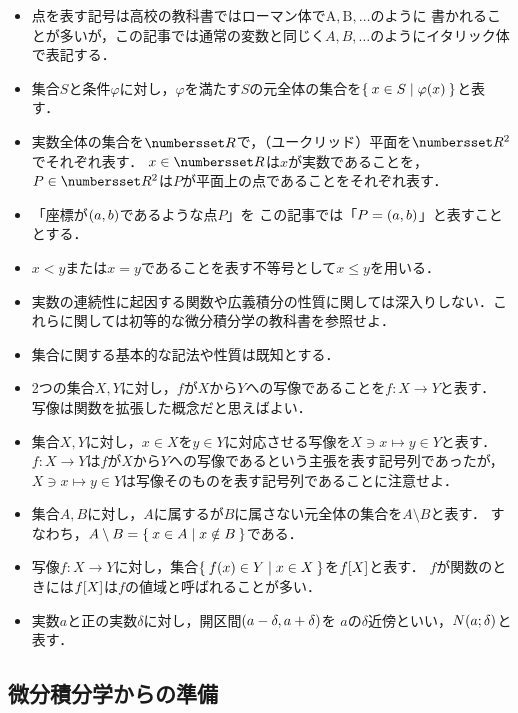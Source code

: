 \documentclass[11pt,a4paper]{ltjsarticle}
\newcommand*{\coord}[1]{\paren{#1}}
\newcommand*{\image}[2]{#1 \sqbracket*{#2}}
\newcommand*{\neighbourfood}[2]{\apply{N}{{#1};{#2}}}
\theoremstyle{definition}
\begin{document}
\begin{itemize}
  \item 点を表す記号は高校の教科書ではローマン体で$\mathrm{A}, \mathrm{B}, \dotsc$のように
        書かれることが多いが，この記事では通常の変数と同じく$A,B, \dotsc$のようにイタリック体で表記する．
  \item 集合$S$と条件$\varphi$に対し，$\varphi$を満たす$S$の元全体の集合を$\setintension{x \in S}{\apply{\varphi}{x}}$と表す．
  \item 実数全体の集合を$\Real$で，（ユークリッド）平面を$\Real ^2$でそれぞれ表す．
        $x \in \Real$は$x$が実数であることを，$P \in \Real ^2$は$P$が平面上の点であることをそれぞれ表す．
  \item 「座標が$\coord{a,b}$であるような点$P$」を
        この記事では「$P = \coord{a,b}$」と表すこととする．
  \item $x < y$または$x = y$であることを表す不等号として$x \leq y$を用いる．
  \item 実数の連続性に起因する関数や広義積分の性質に関しては深入りしない．これらに関しては初等的な微分積分学の教科書を参照せよ．
  \item 集合に関する基本的な記法や性質は既知とする．
  \item 2つの集合$X,Y$に対し，$f$が$X$から$Y$への写像であることを$f \colon X \to Y$と表す．
        写像は関数を拡張した概念だと思えばよい．
  \item 集合$X, Y$に対し，$x \in X$を$y \in Y$に対応させる写像を$X \ni x \mapsto y \in Y$と表す．
        $f \colon X \to Y$は$f$が$X$から$Y$への写像であるという主張を表す記号列であったが，
        $X \ni x \mapsto y \in Y$は写像そのものを表す記号列であることに注意せよ．
  \item 集合$A,B$に対し，$A$に属するが$B$に属さない元全体の集合を$A \setminus B$と表す．
        すなわち，$A \setminus B = \Set{x \in A |x \notin B}$である．
  \item 写像$f \colon X \to Y$に対し，集合$\setintension{\apply{f}{x} \in Y}{x \in X}$を$\image{f}{X}$と表す．
        $f$が関数のときには$\image{f}{X}$は$f$の値域と呼ばれることが多い．
  \item 実数$a$と正の実数$\delta$に対し，開区間$\interval{op}{a - \delta, a + \delta}$を
        $a$の$\delta$近傍といい，$\neighbourfood{a}{\delta}$と表す．
\end{itemize}

\subsection{微分積分学からの準備} \label{subsec:calculus}
\end{document}
